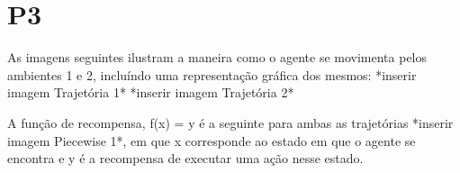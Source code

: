 \documentclass[11pt,twocolumn]{article}
\begin{document}
\section*{P3}

As imagens seguintes ilustram a maneira como o agente se movimenta pelos ambientes 1 e 2, incluíndo uma representação gráfica dos mesmos:
	*inserir imagem Trajetória 1*
	*inserir imagem Trajetória 2*

A função de recompensa, f(x) = y é a seguinte para ambas as trajetórias *inserir imagem Piecewise 1*, em que x corresponde ao estado 
em que o agente se encontra e y é a recompensa de executar uma ação nesse estado.\par
\end{document}
